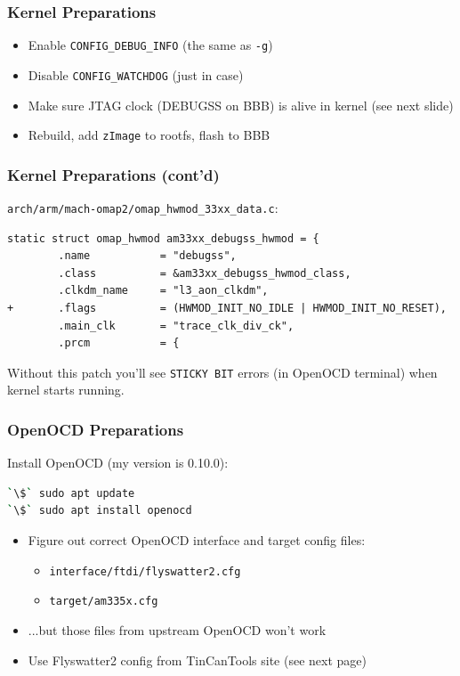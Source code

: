 \begin{frame}
  \frametitle{Kernel Preparations}
  \begin{itemize}
    \item Enable \texttt{CONFIG\_DEBUG\_INFO} (the same as \texttt{-g})
    \item Disable \texttt{CONFIG\_WATCHDOG} (just in case)
    \item Make sure JTAG clock (DEBUGSS on BBB) is alive in kernel
          (see next slide)
    \item Rebuild, add \texttt{zImage} to rootfs, flash to BBB
  \end{itemize}
\end{frame}

\begin{frame}[containsverbatim]
  \frametitle{Kernel Preparations (cont'd)}
  \texttt{arch/arm/mach-omap2/omap\_hwmod\_33xx\_data.c}:
  \begin{lstlisting}
static struct omap_hwmod am33xx_debugss_hwmod = {
        .name           = "debugss",
        .class          = &am33xx_debugss_hwmod_class,
        .clkdm_name     = "l3_aon_clkdm",
+       .flags          = (HWMOD_INIT_NO_IDLE | HWMOD_INIT_NO_RESET),
        .main_clk       = "trace_clk_div_ck",
        .prcm           = {
  \end{lstlisting}
  Without this patch you'll see \texttt{STICKY BIT} errors (in OpenOCD terminal)
  when kernel starts running.
\end{frame}

\begin{frame}[containsverbatim]
  \frametitle{OpenOCD Preparations}
  Install OpenOCD (my version is 0.10.0):
  \begin{lstlisting}[language=bash]
`\$` sudo apt update
`\$` sudo apt install openocd
  \end{lstlisting}

  \begin{itemize}
    \item Figure out correct OpenOCD interface and target config files:\\
      \begin{itemize}
        \item \texttt{interface/ftdi/flyswatter2.cfg}
        \item \texttt{target/am335x.cfg}
      \end{itemize}
    \item ...but those files from upstream OpenOCD won't work
    \item Use Flyswatter2 config from TinCanTools site (see next page)
  \end{itemize}
\end{frame}

